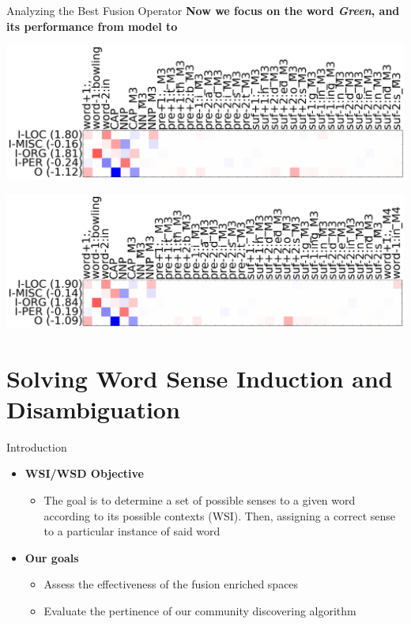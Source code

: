 \documentclass[10pt,=table]{beamer}
\newcommand*\circled[1]{\tikz[baseline=(char.base)]{
            \node[shape=circle,draw,inner sep=1pt] (char) {#1};}}
\begin{document}
\begin{frame}{Analyzing the Best Fusion Operator}
\large \textbf{Now we focus on the word \textit{Green}, and its performance from model \circled{$M_3$} to \circled{$M_4$}}
\vfill
	\begin{overprint}
			\begin{center}
			\includegraphics[width=\linewidth]{image2/Chapitre4/M3_16029.png}
			\end{center}
			\begin{center}
			\includegraphics[width=\linewidth]{image2/Chapitre4/M4_16029.png}
			\end{center}
	\end{overprint}

\end{frame}

\section[Applications to NLP]{Solving Word Sense Induction and Disambiguation}

\begin{frame}{Introduction}
\begin{itemize}
\item<1-> \large \textbf{WSI/WSD Objective}
\begin{itemize}
\item<1->  The goal is to determine a set of possible senses to a given word according to its possible contexts (WSI). Then, assigning a correct sense to a particular instance of said word

\end{itemize}
\item<2-> \large \textbf{Our goals}
\begin{itemize}
\item<2-> Assess the effectiveness of the fusion enriched spaces
\item<2-> Evaluate the pertinence of our community discovering algorithm
\end{itemize}

\end{itemize}
\end{frame}
\end{document}
